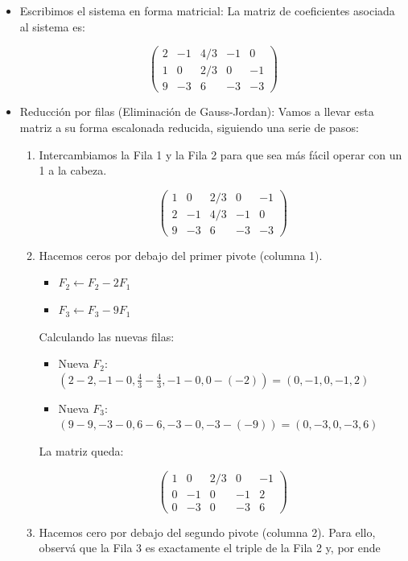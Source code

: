 \documentclass[11pt,spanish]{article}
\begin{document}
\begin{itemize}
\item Escribimos el sistema en forma matricial:
La matriz de coeficientes asociada al sistema es:

$$\begin{pmatrix}
2 & -1 & 4/3 & -1 & 0 \\
1 & 0 & 2/3 & 0 & -1 \\
9 & -3 & 6 & -3 & -3
\end{pmatrix}$$

\item Reducción por filas (Eliminación de Gauss-Jordan):
Vamos a llevar esta matriz a su forma escalonada reducida, siguiendo una serie de pasos:

\begin{enumerate}
\item Intercambiamos la Fila 1 y la Fila 2 para que sea más fácil operar con un 1 a la cabeza.

$$\begin{pmatrix}
1 & 0 & 2/3 & 0 & -1 \\
2 & -1 & 4/3 & -1 & 0 \\
9 & -3 & 6 & -3 & -3
\end{pmatrix}$$

\item Hacemos ceros por debajo del primer pivote (columna 1).

\begin{itemize}
\item $F_2 \leftarrow F_2 - 2F_1$
\item $F_3 \leftarrow F_3 - 9F_1$
\end{itemize}

Calculando las nuevas filas:

\begin{itemize}
\item  Nueva $F_2$: $(2-2, -1-0, \frac{4}{3}-\frac{4}{3}, -1-0, 0 - (-2)) = (0, -1, 0, -1, 2)$
\item  Nueva $F_3$: $(9-9, -3-0, 6-6, -3-0, -3 - (-9)) = (0, -3, 0, -3, 6)$
\end{itemize}

La matriz queda:

$$\begin{pmatrix}
1 & 0 & 2/3 & 0 & -1 \\
0 & -1 & 0 & -1 & 2 \\
0 & -3 & 0 & -3 & 6
\end{pmatrix}$$

\item Hacemos cero por debajo del segundo pivote (columna 2). 
Para ello, observá que la Fila 3 es exactamente el triple de la Fila 2 y, por ende


\end{enumerate}
\end{itemize}
\end{document}
